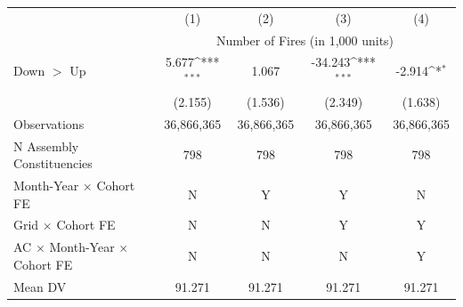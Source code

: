 {
\def\sym#1{\ifmmode^{#1}\else\(^{#1}\)\fi}
\begin{tabular}{l*{4}{c}}
\hline
            &\multicolumn{1}{c}{(1)}         &\multicolumn{1}{c}{(2)}         &\multicolumn{1}{c}{(3)}         &\multicolumn{1}{c}{(4)}         \\
            & \multicolumn{4}{c}{Number of Fires (in 1,000 units)} \\ \hline

Down $>$ Up &       5.677\sym{***}&       1.067         &     -34.243\sym{***}&      -2.914\sym{*}  \\
            &     (2.155)         &     (1.536)         &     (2.349)         &     (1.638)         \\
\hline
Observations&  36,866,365         &  36,866,365         &  36,866,365         &  36,866,365         \\
N Assembly Constituencies&         798         &         798         &         798         &         798         \\
Month-Year $\times$ Cohort FE&           N         &           Y         &           Y         &           N         \\
Grid $\times$ Cohort FE&           N         &           N         &           Y         &           Y         \\
AC $\times$ Month-Year $\times$ Cohort FE&           N         &           N         &           N         &           Y         \\
Mean DV     &      91.271         &      91.271         &      91.271         &      91.271         \\
\hline
\end{tabular}
}
